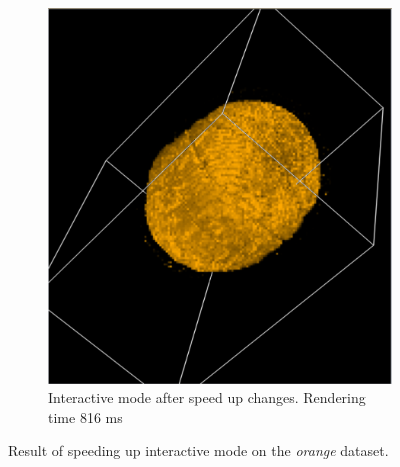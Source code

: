 \documentclass[a4paper]{article}
\begin{document}
\begin{figure}[h]
\begin{subfigure}[b]{0.45\textwidth}
    \includegraphics[width=\textwidth]{after-speedup}
    \caption{Interactive mode after speed up changes. Rendering time 816 ms}
  \end{subfigure}
  \caption{Result of speeding up interactive mode on the \textit{orange} dataset.}
  \label{fig:speedup}
\end{figure}
\end{document}
